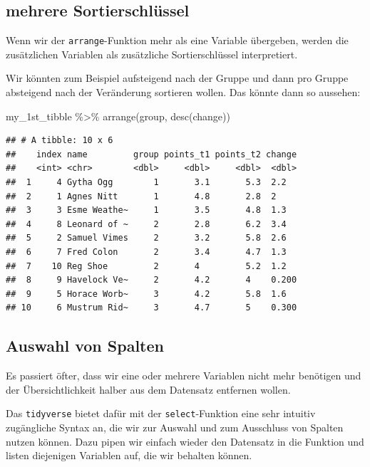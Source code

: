 \documentclass[
]{book}
\newenvironment{Shaded}{\begin{snugshade}}{\end{snugshade}}
\newcommand{\FunctionTok}[1]{\textcolor[rgb]{0.00,0.00,0.00}{#1}}
\newcommand{\NormalTok}[1]{#1}
\newcommand{\SpecialCharTok}[1]{\textcolor[rgb]{0.00,0.00,0.00}{#1}}
\begin{document}
\hypertarget{mehrere-sortierschluxfcssel}{%
\subsection{mehrere Sortierschlüssel}\label{mehrere-sortierschluxfcssel}}

Wenn wir der \texttt{arrange}-Funktion mehr als eine Variable übergeben, werden die zusätzlichen Variablen als zusätzliche Sortierschlüssel interpretiert.

Wir könnten zum Beispiel aufsteigend nach der Gruppe und dann pro Gruppe absteigend nach der Veränderung sortieren wollen. Das könnte dann so aussehen:

\begin{Shaded}
\begin{Highlighting}[]
\NormalTok{my\_1st\_tibble }\SpecialCharTok{\%\textgreater{}\%} 
  \FunctionTok{arrange}\NormalTok{(group, }\FunctionTok{desc}\NormalTok{(change))}
\end{Highlighting}
\end{Shaded}

\begin{verbatim}
## # A tibble: 10 x 6
##    index name         group points_t1 points_t2 change
##    <int> <chr>        <dbl>     <dbl>     <dbl>  <dbl>
##  1     4 Gytha Ogg        1       3.1       5.3  2.2  
##  2     1 Agnes Nitt       1       4.8       2.8  2    
##  3     3 Esme Weathe~     1       3.5       4.8  1.3  
##  4     8 Leonard of ~     2       2.8       6.2  3.4  
##  5     2 Samuel Vimes     2       3.2       5.8  2.6  
##  6     7 Fred Colon       2       3.4       4.7  1.3  
##  7    10 Reg Shoe         2       4         5.2  1.2  
##  8     9 Havelock Ve~     2       4.2       4    0.200
##  9     5 Horace Worb~     3       4.2       5.8  1.6  
## 10     6 Mustrum Rid~     3       4.7       5    0.300
\end{verbatim}

\hypertarget{auswahl-von-spalten}{%
\subsection{Auswahl von Spalten}\label{auswahl-von-spalten}}

Es passiert öfter, dass wir eine oder mehrere Variablen nicht mehr benötigen und der Übersichtlichkeit halber aus dem Datensatz entfernen wollen.

Das \texttt{tidyverse} bietet dafür mit der \texttt{select}-Funktion eine sehr intuitiv zugängliche Syntax an, die wir zur Auswahl und zum Ausschluss von Spalten nutzen können. Dazu pipen wir einfach wieder den Datensatz in die Funktion und listen diejenigen Variablen auf, die wir behalten können.
\end{document}

